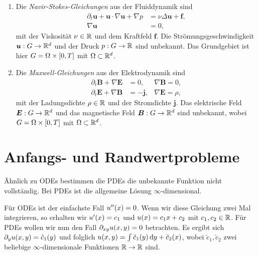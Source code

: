 \documentclass{lecture}
\begin{document}
\begin{example}
\begin{enumerate}
            \item Die \emph{Navir-Stokes-Gleichungen} aus der Fluiddynamik sind
            \begin{align*}
                \partial_t \bm{u} + \bm{u} \cdot \nabla\bm{u} + \nabla p &= \nu\Delta\bm{u} + \bm{f},\\
                \nabla\bm{u} &= 0,
            \end{align*}
            mit der Viskosität \(\nu \in \R\) und dem Kraftfeld \(\bm{f}\).
            Die Strömungsgeschwindigkeit \(\bm{u}: G \to \R^d\) und der Druck \(p: G \to \R\) sind unbekannt.
            Das Grundgebiet ist hier \(G = \Omega \times \brackets*{0, T}\) mit \(\Omega \subset \R^d\).
            \item Die \emph{Maxwell-Gleichungen} aus der Elektrodynamik sind
            \begin{align*}
                \partial_t \bm{B} + \nabla\bm{E} &= 0, & \nabla\bm{B} = 0,\\
                \partial_t \bm{E} + \nabla\bm{B} &= -\bm{j}, & \nabla\bm{E} = \rho,
            \end{align*}
            mit der Ladungsdichte \(\rho \in \R\) und der Stromdichte \(\bm{j}\).
            Das elektrische Feld \(\bm{E}: G \to \R^d\) und das magnetische Feld \(\bm{B}: G \to \R^d\) sind unbekannt, wobei \(G = \Omega \times \brackets*{0, T}\) mit \(\Omega \subset \R^d\).
        \end{enumerate}
    \end{example}


    \section*{Anfangs- und Randwertprobleme}

    Ähnlich zu ODEs bestimmen die PDEs die unbekannte Funktion nicht vollständig.
    Bei PDEs ist die allgemeine Lösung \(\infty\)-dimensional.

    \begin{example}
        Für ODEs ist der einfachste Fall \(u''\parentheses*{x} = 0\).
        Wenn wir diese Gleichung zwei Mal integrieren, so erhalten wir \(u'\parentheses*{x} = c_1\) und \(u\parentheses*{x} = c_1 x + c_2\) mit \(c_1, c_2 \in \R\).
        Für PDEs wollen wir nun den Fall \(\partial_{xy}u\parentheses*{x, y} = 0\) betrachten.
        Es ergibt sich \(\partial_y u\parentheses*{x, y} = \tilde{c}_1\parentheses*{y}\) und folglich \(u\parentheses*{x, y} = \int \tilde{c}_1\parentheses*{y}\d y + \tilde{c}_2\parentheses*{x}\), wobei \(\tilde{c}_1, \tilde{c}_2\) zwei beliebige \(\infty\)-dimensionale Funktionen \(\R \to \R\) sind.
    \end{example}
\end{document}
